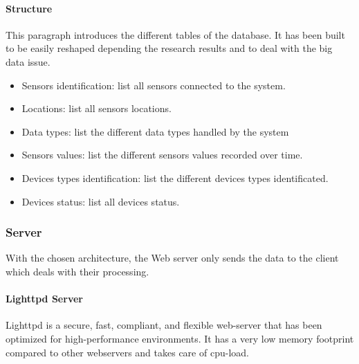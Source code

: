     
    \paragraph{Structure}
    
    This paragraph introduces the different tables of the database. It has been built to be easily reshaped depending the research results and to deal with the big data issue. %
    
    \begin{itemize} %
    \item Sensors identification: list all sensors connected to the system.
    \item Locations: list all sensors locations.
    \item Data types: list the different data types handled by the system
    \item Sensors values: list the different sensors values recorded over time.
    \item Devices types identification: list the different devices types identificated.
    \item Devices status: list all devices status.
    \end{itemize}
    
    
\subsubsection{Server}

    With the chosen architecture, the Web server only sends the data to the client which deals with their processing.
    
    \paragraph{Lighttpd Server}
    Lighttpd is a secure, fast, compliant, and flexible web-server that has been optimized for high-performance environments. It has a very low memory footprint compared to other webservers and takes care of cpu-load.






